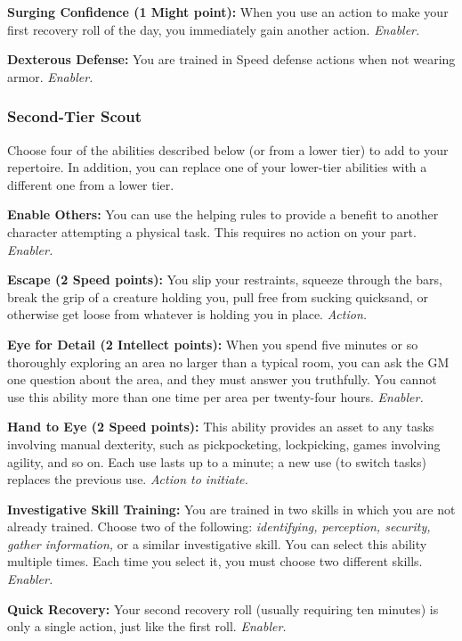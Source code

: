 \documentclass[a4paper,10pt,final,twocolumn,oneside]{book}
\newcommand{\itemAbility}[2]{\textcolor{25gray}{\textbullet\textbf{ #1:}}{ #2}\par}
\newcommand{\enabler}{\textit{ Enabler.}}
\newcommand{\action}{\textit{ Action.}}
\newcommand{\actionInit}{\textit{ Action to initiate.}}
\begin{document}
\itemAbility{Surging Confidence (1 Might point)}{When you use an action to make your first recovery roll of the day, you immediately gain another action.\enabler}

\itemAbility{Dexterous Defense}{You are trained in Speed defense actions when not wearing armor.\enabler}


\subsubsection*{Second-Tier Scout}
\label{subsub:scoutSecondTier}

Choose four of the abilities described
below (or from a lower tier) to add to your
repertoire. In addition, you can replace one
of your lower-tier abilities with a different
one from a lower tier.

\itemAbility{Enable Others}{You can use the helping rules to provide a benefit to another character attempting a physical task. This requires no action on your part.\enabler}

\itemAbility{Escape (2 Speed points)}{You slip your restraints, squeeze through the bars, break the grip of a creature holding you, pull free from sucking quicksand, or otherwise get loose from whatever is holding you in place.\action}

\itemAbility{Eye for Detail (2 Intellect points)}{When you spend five minutes or so thoroughly exploring an area no larger than a typical room, you can ask the GM one question about the area, and they must answer you truthfully. You cannot use this ability more than one time per area per twenty-four hours.\enabler}

\itemAbility{Hand to Eye (2 Speed points)}{This ability provides an asset to any tasks involving manual dexterity, such as pickpocketing, lockpicking, games involving agility, and so on. Each use lasts up to a minute; a new use (to switch tasks) replaces the previous use.\actionInit}

\itemAbility{Investigative Skill Training}{You are trained in two skills in which you are not already trained. Choose two of the following: \textit{identifying, perception, security, gather information,} or a similar investigative skill. You can select this ability multiple times. Each time you select it, you must choose two different skills.\enabler}

\itemAbility{Quick Recovery}{Your second recovery roll (usually requiring ten minutes) is only a single action, just like the first roll.\enabler}
\end{document}

